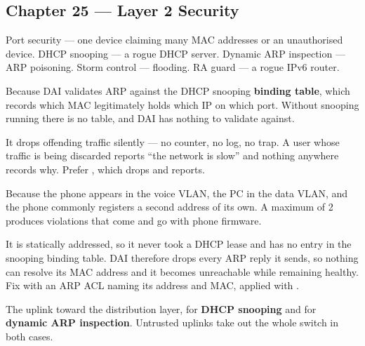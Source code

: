 \subsection*{Chapter 25 --- Layer 2 Security}
\begin{tightnum}
  \item Port security --- one device claiming many MAC addresses or an
        unauthorised device. DHCP snooping --- a rogue DHCP server. Dynamic ARP
        inspection --- ARP poisoning. Storm control --- flooding. RA guard --- a
        rogue IPv6 router.
  \item Because DAI validates ARP against the DHCP snooping \textbf{binding
        table}, which records which MAC legitimately holds which IP on which port.
        Without snooping running there is no table, and DAI has nothing to
        validate against.
  \item It drops offending traffic silently --- no counter, no log, no trap. A
        user whose traffic is being discarded reports ``the network is slow'' and
        nothing anywhere records why. Prefer , which drops and
        reports.
  \item Because the phone appears in the voice VLAN, the PC in the data VLAN, and
        the phone commonly registers a second address of its own. A maximum of 2
        produces violations that come and go with phone firmware.
  \item It is statically addressed, so it never took a DHCP lease and has no entry
        in the snooping binding table. DAI therefore drops every ARP reply it
        sends, so nothing can resolve its MAC address and it becomes unreachable
        while remaining healthy. Fix with an ARP ACL naming its address and MAC,
        applied with .
  \item The uplink toward the distribution layer, for \textbf{DHCP snooping} and
        for \textbf{dynamic ARP inspection}. Untrusted uplinks take out the whole
        switch in both cases.
\end{tightnum}


